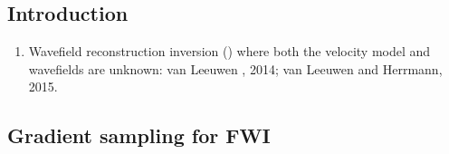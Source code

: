 \renewcommand{\pmk}{Louboutin\_2017\_EAGE\_Gradient sampling algorithm}
\renewcommand{\prf}{FWI/\pmk.pdf}
\renewcommand{\pti}{Extending the Search Space of Time-domain Adjoint-state FWI with Randomized Implicit Time Shifts}
\renewcommand{\pay}{M. Louboutin, F. J. Herrmann, 2017}
\renewcommand{\pjo}{79th EAGE Conference \& Exhibition}
\renewcommand{\pda}{2018/12/5 Wen.}
\section{\pinfo}
\subsection{Introduction}
\begin{enumerate}[\hspace{10mm}*]
  \item Wavefield reconstruction inversion () where both the velocity model and wavefields are unknown: van Leeuwen \etal, 2014; van Leeuwen and Herrmann, 2015.
\end{enumerate}\par
\subsection{Gradient sampling for FWI}

